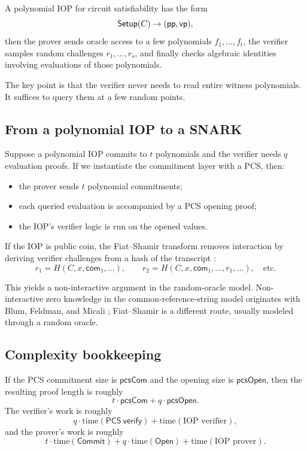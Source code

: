 A polynomial IOP for circuit satisfiability has the form
\[
\mathsf{Setup}(C)\to (\mathsf{pp},\mathsf{vp}),
\]
then the prover sends oracle access to a few polynomials $f_1,\dots,f_t$, the verifier samples random challenges $r_1,\dots,r_s$, and finally checks algebraic identities involving evaluations of those polynomials.

The key point is that the verifier never needs to read entire witness polynomials. It suffices to query them at a few random points.

\subsection{From a polynomial IOP to a SNARK}

Suppose a polynomial IOP commits to $t$ polynomials and the verifier needs $q$ evaluation proofs. If we instantiate the commitment layer with a PCS, then:
\begin{itemize}[leftmargin=2em]
    \item the prover sends $t$ polynomial commitments;
    \item each queried evaluation is accompanied by a PCS opening proof;
    \item the IOP's verifier logic is run on the opened values.
\end{itemize}

If the IOP is public coin, the Fiat--Shamir transform removes interaction by deriving verifier challenges from a hash of the transcript \cite{FiatShamir1986}:
\[
 r_1 = H(C,x,\mathsf{com}_1,\dots),\qquad
 r_2 = H(C,x,\mathsf{com}_1,\dots,r_1,\dots),\quad \text{etc.}
\]

This yields a non-interactive argument in the random-oracle model. Non-interactive zero knowledge in the common-reference-string model originates with Blum, Feldman, and Micali \cite{BlumFeldmanMicali1988}; Fiat--Shamir is a different route, usually modeled through a random oracle.

\subsection{Complexity bookkeeping}

If the PCS commitment size is $\mathsf{pcsCom}$ and the opening size is $\mathsf{pcsOpen}$, then the resulting proof length is roughly
\[
 t\cdot \mathsf{pcsCom} + q\cdot \mathsf{pcsOpen}.
\]
The verifier's work is roughly
\[
 q\cdot \mathrm{time}(\mathsf{PCS\ verify}) + \mathrm{time}(\text{IOP verifier}),
\]
and the prover's work is roughly
\[
 t\cdot \mathrm{time}(\mathsf{Commit}) + q\cdot \mathrm{time}(\mathsf{Open}) + \mathrm{time}(\text{IOP prover}).
\]

